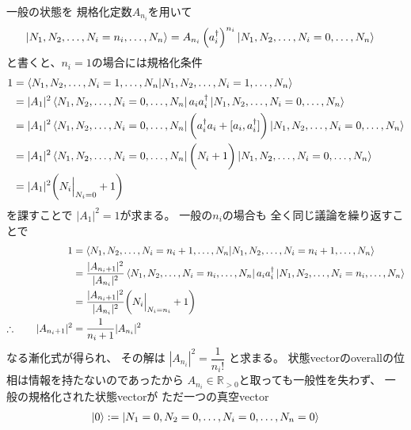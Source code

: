 一般の状態を
規格化定数$A_{n_i}$を用いて
\begin{align}
    \ket{N_1, N_2,\dots,N_i=n_i,\dots, N_n}
    &=
    A_{n_i}
    \left(
        a_i^\dagger
    \right)^{n_i}
    \ket{N_1, N_2,\dots,
    N_i = 0,
    \dots, N_n}
\end{align}
と書くと、$n_i = 1$の場合には規格化条件
\begin{align}
    1 &=
    \braket{
        N_1, N_2,\dots,N_i = 1,\dots, N_n
        |
        N_1, N_2,\dots,N_i = 1,\dots, N_n
    }
\notag\\&=
    |A_1|^2
    \bra{N_1, N_2,\dots, N_i = 0,\dots, N_n}
    a_i
    a_i^\dagger
    \ket{N_1, N_2,\dots, N_i = 0,\dots, N_n}
\notag\\&=
    |A_1|^2
    \bra{N_1, N_2,\dots, N_i = 0,\dots, N_n}
    \bigg(
        a_i^\dagger
        a_i
        +
        [
        a_i
        ,
        a_i^\dagger
        ]
    \bigg)
    \ket{N_1, N_2,\dots, N_i = 0,\dots, N_n}
\notag\\&=
    |A_1|^2
    \bra{N_1, N_2,\dots, N_i = 0,\dots, N_n}
    \bigg(
        N_i
        +
        1
    \bigg)
    \ket{N_1, N_2,\dots, N_i = 0,\dots, N_n}
\notag\\&=
    |A_1|^2
    \bigg(
        N_i
            \Big|_{N_i=0}
        +
        1
    \bigg)
\end{align}
を課すことで
$|A_1|^2 = 1$が求まる。
一般の$n_i$の場合も
全く同じ議論を繰り返すことで
\begin{align}
    1 &=
    \braket{
        N_1, N_2,\dots,N_i = n_i + 1 ,\dots, N_n
        |
        N_1, N_2,\dots,N_i = n_i + 1 ,\dots, N_n
    }
\notag\\&=
    \dfrac{
        |A_{n_i + 1}|^2
    }{
        |A_{n_i}|^2
    }
    \bra{N_1, N_2,\dots, N_i = n_i ,\dots, N_n}
    a_i
    a_i^\dagger
    \ket{N_1, N_2,\dots, N_i = n_i ,\dots, N_n}
\notag\\&=
    \dfrac{
        |A_{n_i + 1}|^2
    }{
        |A_{n_i}|^2
    }
    \bigg(
        N_i
            \Big|_{N_i=n_i}
        +
        1
    \bigg)
\notag\\\therefore\qquad
    |A_{n_i + 1}|^2 &=
    \dfrac{1}{
        n_i + 1
    }
    |A_{n_i}|^2
\end{align}
なる漸化式が得られ、
その解は
$|A_{n_i}|^2 = \dfrac{1}{n_i!}$
と求まる。
状態vectorのoverallの位相は情報を持たないのであったから
$A_{n_i} \in \mathbb{R}_{>0}$と取っても一般性を失わず、
一般の規格化された状態vectorが
ただ一つの真空vector
\begin{align}
    \ket{0}:=
    \ket{N_1 = 0, N_2 = 0 ,\dots,
    N_i = 0,
    \dots, N_n = 0}
\end{align}
